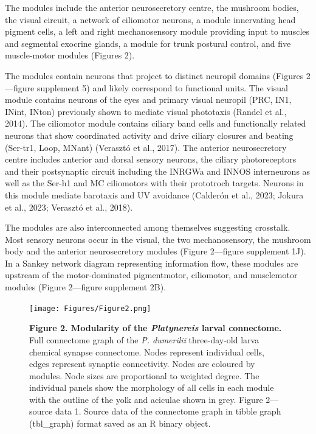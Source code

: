 \documentclass[
  11pt,
]{article}
\begin{document}
The modules include the anterior neurosecretory centre, the mushroom
bodies, the visual circuit, a network of ciliomotor neurons, a module
innervating head pigment cells, a left and right mechanosensory module
providing input to muscles and segmental exocrine glands, a module for
trunk postural control, and five muscle-motor modules (Figures 2).

The modules contain neurons that project to distinct neuropil domains
(Figures 2---figure supplement 5) and likely correspond to functional
units. The visual module contains neurons of the eyes and primary visual
neuropil (PRC, IN1, INint, INton) previously shown to mediate visual
phototaxis (Randel et al., 2014). The ciliomotor module contains ciliary
band cells and functionally related neurons that show coordinated
activity and drive ciliary closures and beating (Ser-tr1, Loop, MNant)
(Verasztó et al., 2017). The anterior neurosecretory centre includes
anterior and dorsal sensory neurons, the ciliary photoreceptors and
their postsynaptic circuit including the INRGWa and INNOS interneurons
as well as the Ser-h1 and MC ciliomotors with their prototroch targets.
Neurons in this module mediate barotaxis and UV avoidance (Calderón et
al., 2023; Jokura et al., 2023; Verasztó et al., 2018).

The modules are also interconnected among themselves suggesting
crosstalk. Most sensory neurons occur in the visual, the two
mechanosensory, the mushroom body and the anterior neurosecretory
modules (Figure 2---figure supplement 1J). In a Sankey network diagram
representing information flow, these modules are upstream of the
motor-dominated pigmentmotor, ciliomotor, and musclemotor modules
(Figure 2---figure supplement 2B).

\begin{figure}[H]

{\centering \texttt{[image: Figures/Figure2.png]}

}

\caption{\textbf{Figure 2. Modularity of the \emph{Platynereis} larval
connectome.} Full connectome graph of the \emph{P. dumerilii}
three-day-old larva chemical synapse connectome. Nodes represent
individual cells, edges represent synaptic connectivity. Nodes are
coloured by modules. Node sizes are proportional to weighted degree. The
individual panels show the morphology of all cells in each module with
the outline of the yolk and aciculae shown in grey. Figure 2---source
data 1. Source data of the connectome graph in tibble graph (tbl\_graph)
format saved as an R binary object.}

\end{figure}%
\end{document}
